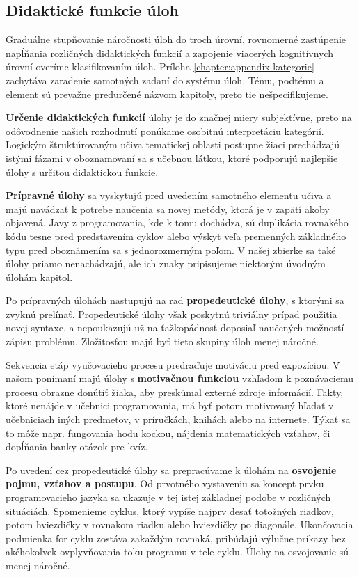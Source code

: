 \subsection{Didaktické funkcie úloh}
Graduálne stupňovanie náročnosti úloh do troch úrovní, rovnomerné zastúpenie napĺňania rozličných didaktických funkcií a zapojenie viacerých kognitívnych úrovní overíme klasifikovaním úloh. Príloha \ref{chapter:appendix-kategorie} zachytáva zaradenie samotných zadaní do systému úloh. Tému, podtému a element sú prevažne predurčené názvom kapitoly, preto tie nešpecifikujeme.

\textbf{Určenie didaktických funkcií} úlohy je do značnej miery subjektívne, preto na odôvodnenie našich rozhodnutí ponúkame osobitnú interpretáciu kategórií. Logickým štruktúrovaným učiva tematickej oblasti postupne žiaci prechádzajú istými fázami v oboznamovaní sa s učebnou látkou, ktoré podporujú najlepšie úlohy s určitou didaktickou funkcie.

\textbf{Prípravné úlohy} sa vyskytujú pred uvedením samotného elementu učiva a majú navádzať k potrebe naučenia sa novej metódy, ktorá je v zapätí akoby objavená. Javy z programovania, kde k tomu dochádza, sú duplikácia rovnakého kódu tesne pred predstavením cyklov alebo výskyt veľa premenných základného typu pred oboznámením sa s jednorozmerným poľom. V našej zbierke sa také úlohy priamo nenachádzajú, ale ich znaky pripisujeme niektorým úvodným úlohám kapitol.

Po prípravných úlohách nastupujú na rad \textbf{propedeutické úlohy}, s ktorými sa zvyknú prelínať. Propedeutické úlohy však poskytnú triviálny prípad použitia novej syntaxe, a nepoukazujú už na ťažkopádnosť doposiaľ naučených možností zápisu problému. Zložitosťou majú byť tieto skupiny úloh menej náročné.

Sekvencia etáp vyučovacieho procesu predraďuje motiváciu pred expozíciou. V našom ponímaní majú úlohy s \textbf{motivačnou funkciou} vzhľadom k poznávaciemu procesu obrazne donútiť žiaka, aby preskúmal externé zdroje informácií. Fakty, ktoré nenájde v učebnici programovania, má byť potom motivovaný hľadať v učebniciach iných predmetov, v príručkách, knihách alebo na internete. Týkať sa to môže napr. fungovania hodu kockou, nájdenia matematických vzťahov, či dopĺňania banky otázok pre kvíz.

Po uvedení cez propedeutické úlohy sa prepracúvame k úlohám na \textbf{osvojenie pojmu, vzťahov a postupu}. Od prvotného vystaveniu sa koncept prvku programovacieho jazyka sa
ukazuje v tej istej základnej podobe v rozličných situáciách. Spomenieme cyklus, ktorý vypíše najprv desať totožných riadkov, potom hviezdičky v rovnakom riadku alebo hviezdičky po diagonále. Ukončovacia podmienka for cyklu zostáva zakaždým rovnaká, pribúdajú výlučne príkazy bez akéhokoľvek ovplyvňovania toku programu v tele cyklu. Úlohy na osvojovanie sú menej náročné.

